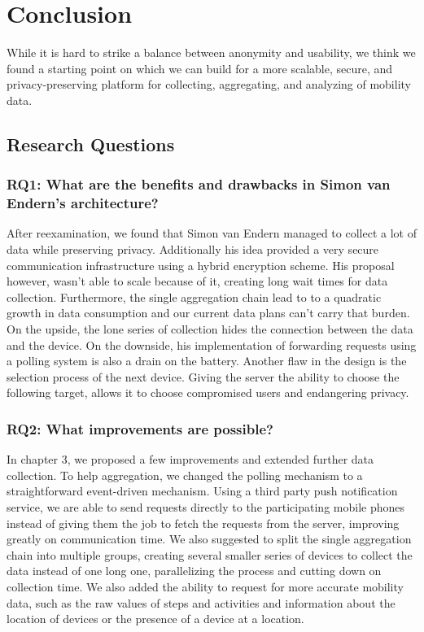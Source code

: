 
\chapter{Conclusion}\label{chapter:conclusion}
While it is hard to strike a balance between anonymity and usability, we think we found a starting point on which we can build for a more scalable, secure, and privacy-preserving platform for collecting, aggregating, and analyzing of mobility data.

\section{Research Questions}
\subsection*{RQ1: What are the benefits and drawbacks in Simon van Endern's architecture?}
After reexamination, we found that Simon van Endern managed to collect a lot of data while preserving privacy. Additionally his idea provided a very secure communication infrastructure using a hybrid encryption scheme. His proposal however, wasn't able to scale because of it, creating long wait times for data collection. Furthermore, the single aggregation chain lead to to a quadratic growth in  data consumption and our current data plans can't carry that burden. On the upside, the lone series of collection hides the connection between the data and the device. On the downside, his implementation of forwarding requests using a polling system is also a drain on the battery.
Another flaw in the design is the selection process of the next device. Giving the server the ability to choose the following target, allows it to choose compromised users and endangering privacy. 

\subsection*{RQ2: What improvements are possible?}
In chapter 3, we proposed a few improvements and extended further data collection. To help aggregation, we changed the polling mechanism to a straightforward event-driven mechanism. Using a third party push notification service, we are able to send requests directly to the participating mobile phones instead of giving them the job to fetch the requests from the server, improving greatly on communication time. We also suggested to split the single aggregation chain into multiple groups, creating several smaller series of devices to collect the data instead of one long one, parallelizing the process and cutting down on collection time. We also added the ability to request for more accurate mobility data, such as the raw values of steps and activities and information about the location of devices or the presence of a device at a location. 

